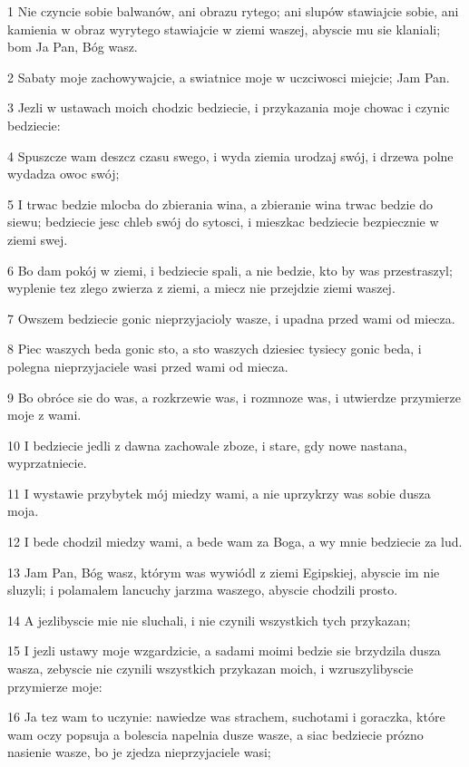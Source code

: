 \par 1 Nie czyncie sobie balwanów, ani obrazu rytego; ani slupów stawiajcie sobie, ani kamienia w obraz wyrytego stawiajcie w ziemi waszej, abyscie mu sie klaniali; bom Ja Pan, Bóg wasz.
\par 2 Sabaty moje zachowywajcie, a swiatnice moje w uczciwosci miejcie; Jam Pan.
\par 3 Jezli w ustawach moich chodzic bedziecie, i przykazania moje chowac i czynic bedziecie:
\par 4 Spuszcze wam deszcz czasu swego, i wyda ziemia urodzaj swój, i drzewa polne wydadza owoc swój;
\par 5 I trwac bedzie mlocba do zbierania wina, a zbieranie wina trwac bedzie do siewu; bedziecie jesc chleb swój do sytosci, i mieszkac bedziecie bezpiecznie w ziemi swej.
\par 6 Bo dam pokój w ziemi, i bedziecie spali, a nie bedzie, kto by was przestraszyl; wyplenie tez zlego zwierza z ziemi, a miecz nie przejdzie ziemi waszej.
\par 7 Owszem bedziecie gonic nieprzyjacioly wasze, i upadna przed wami od miecza.
\par 8 Piec waszych beda gonic sto, a sto waszych dziesiec tysiecy gonic beda, i polegna nieprzyjaciele wasi przed wami od miecza.
\par 9 Bo obróce sie do was, a rozkrzewie was, i rozmnoze was, i utwierdze przymierze moje z wami.
\par 10 I bedziecie jedli z dawna zachowale zboze, i stare, gdy nowe nastana, wyprzatniecie.
\par 11 I wystawie przybytek mój miedzy wami, a nie uprzykrzy was sobie dusza moja.
\par 12 I bede chodzil miedzy wami, a bede wam za Boga, a wy mnie bedziecie za lud.
\par 13 Jam Pan, Bóg wasz, którym was wywiódl z ziemi Egipskiej, abyscie im nie sluzyli; i polamalem lancuchy jarzma waszego, abyscie chodzili prosto.
\par 14 A jezlibyscie mie nie sluchali, i nie czynili wszystkich tych przykazan;
\par 15 I jezli ustawy moje wzgardzicie, a sadami moimi bedzie sie brzydzila dusza wasza, zebyscie nie czynili wszystkich przykazan moich, i wzruszylibyscie przymierze moje:
\par 16 Ja tez wam to uczynie: nawiedze was strachem, suchotami i goraczka, które wam oczy popsuja a bolescia napelnia dusze wasze, a siac bedziecie prózno nasienie wasze, bo je zjedza nieprzyjaciele wasi;

